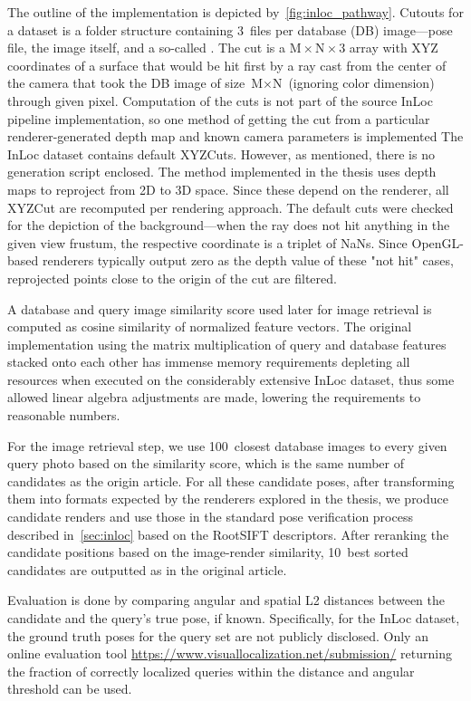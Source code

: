 The outline of the implementation is depicted by~\cref{fig:inloc_pathway}.  Cutouts for a
dataset is a folder structure containing 3~files per database (DB) image---pose file, the image
itself, and a so-called . The cut is a $\text{M}\times\text{N}\times3$ array
with XYZ coordinates of a surface that would be hit first by a ray cast from the center of
the camera that took the DB image of size $\text{M}\times\text{N}$ (ignoring color
dimension) through given pixel. Computation of the cuts is not part of the source InLoc
pipeline implementation, so one method of getting the cut from a particular
renderer-generated  depth map and known camera parameters is
implemented
The InLoc dataset contains default XYZCuts. However, as mentioned, there is no generation
script enclosed. The method implemented in the thesis uses depth maps to reproject from 2D
to 3D space. Since these depend on the renderer, all XYZCut are recomputed per rendering
approach. The default cuts were checked for the depiction of the background---when the ray
does not hit anything in the given view frustum, the respective coordinate is a triplet of
NaNs. Since OpenGL-based renderers typically output zero as the depth value of these "not hit"
cases, reprojected points close to the origin of the cut are filtered.

A database and query image similarity score used later for image retrieval is computed as
cosine similarity of normalized feature vectors. The original implementation using the
matrix multiplication of query and database features stacked onto each other has immense
memory requirements depleting all resources when executed on the considerably extensive
InLoc dataset, thus some allowed linear algebra adjustments are made, lowering the
requirements to reasonable numbers.

For the image retrieval step, we use 100~closest database images to every given query
photo based on the similarity score, which is the same number of candidates as the origin
article.  For all these candidate poses, after transforming them into formats expected by
the renderers explored in the thesis, we produce candidate renders and use those in the
standard pose verification process described in~\cref{sec:inloc} based on the RootSIFT
descriptors. After reranking the candidate positions based on the image-render similarity,
10~best sorted candidates are outputted as in the original article.

Evaluation is done by comparing angular and spatial L2 distances between the candidate and
the query's true pose, if known. Specifically, for the InLoc dataset, the ground truth
poses for the query set are not publicly disclosed. Only an online evaluation tool
\url{https://www.visuallocalization.net/submission/} returning the fraction of correctly
localized queries within the distance and angular threshold can be used.

